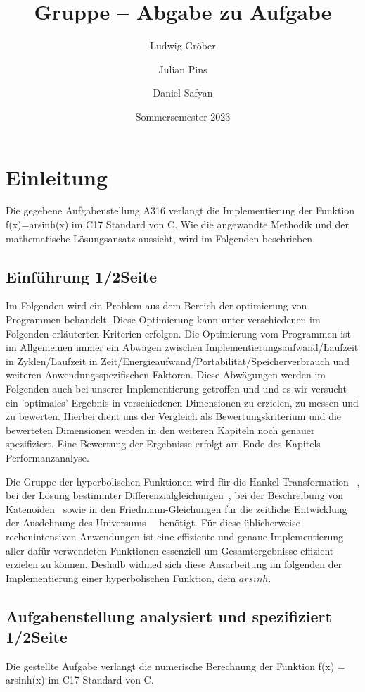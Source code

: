 \documentclass[course=erap]{aspdoc}
\author{Ludwig Gröber \and Julian Pins \and Daniel Safyan}
\date{Sommersemester 2023} %
\title{Gruppe \theGroup{} -- Abgabe zu Aufgabe \theNumber}
\begin{document}
    \maketitle


    \section{Einleitung}
    Die gegebene Aufgabenstellung A316 verlangt die Implementierung der Funktion f(x)=arsinh(x) im C17 Standard von C.
    Wie die angewandte Methodik und der mathematische Lösungsansatz aussieht, wird im Folgenden beschrieben.

    \subsection{Einführung 1/2Seite}
    Im Folgenden wird ein Problem aus dem Bereich der optimierung von Programmen behandelt.
    Diese Optimierung kann unter verschiedenen im Folgenden erläuterten Kriterien erfolgen.
    Die Optimierung vom Programmen ist im Allgemeinen immer ein Abwägen zwischen Implementierungsaufwand/Laufzeit in Zyklen/Laufzeit in Zeit/Energieaufwand/Portabilität/Speicherverbrauch und weiteren Anwendungsspezifischen Faktoren.
    Diese Abwägungen werden im Folgenden auch bei unserer Implementierung getroffen und und es wir versucht ein 'optimales' Ergebnis in verschiedenen Dimensionen zu erzielen, zu messen und zu bewerten.
    Hierbei dient uns der Vergleich als Bewertungskriterium und die bewerteten Dimensionen werden in den weiteren Kapiteln noch genauer spezifiziert.
    Eine Bewertung der Ergebnisse erfolgt am Ende des Kapitels Performanzanalyse.


    Die Gruppe der hyperbolischen Funktionen wird für die Hankel-Transformation~\cite{hankel} ,
    bei der Lösung bestimmter Differenzialgleichungen~\cite{differenzial}, bei der Beschreibung von Katenoiden~\cite{katenoid}
    sowie in den Friedmann-Gleichungen für die zeitliche Entwicklung der Ausdehnung des Universums~\cite{universum1,universum2}~ benötigt.
    Für diese üblicherweise rechenintensiven Anwendungen ist eine effiziente und genaue Implementierung aller dafür verwendeten Funktionen essenziell um Gesamtergebnisse effizient erzielen zu können.
    Deshalb widmed sich diese Ausarbeitung im folgenden der Implementierung einer hyperbolischen Funktion, dem $arsinh$.

    \subsection{Aufgabenstellung analysiert und spezifiziert 1/2Seite}
    Die gestellte Aufgabe verlangt die numerische Berechnung der Funktion f(x) = arsinh(x) im C17 Standard von C.
\end{document}
